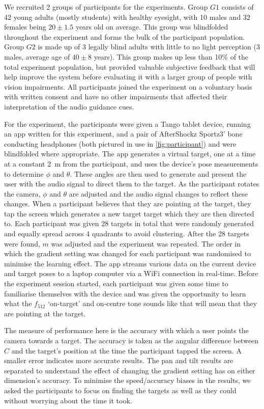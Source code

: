 \documentclass{llncs}
\begin{document}
We recruited 2 groups of participants for the experiments.
Group $G1$ consists of 42 young adults (mostly students) with healthy eyesight, with 10 males and 32 females being $20\pm1.5$ years old on average.
This group was blindfolded throughout the experiment and forms the bulk of the participant population.
Group $G2$ is made up of 3 legally blind adults with little to no light perception (3 males, average age of $40\pm8$ years). 
This group makes up less than 10\% of the total experiment population, but provided valuable subjective feedback that will help improve the system before evaluating it with a larger group of people with vision impairments. 
All participants joined the experiment on a voluntary basis with written consent and have no other impairments that affected their interpretation of the audio guidance cues.

For the experiment, the participants were given a Tango tablet device, running an app written for this experiment, and a pair of AfterShockz Sportz3' bone conducting headphones (both pictured in use in \cref{fig:participant}) and were blindfolded where appropriate.
The app generates a virtual target, one at a time at a constant \SI{2}{\metre} from the participant, and uses the device's pose measurements to determine $\phi$ and $\theta$.
These angles are then used to generate and present the user with the audio signal to direct them to the target. 
As the participant rotates the camera, $\phi$ and $\theta$ are adjusted and the audio signal changes to reflect these changes.
When a participant believes that they are pointing at the target, they tap the screen which generates a new target target which they are then directed to. 
Each participant was given 28 targets in total that were randomly generated and equally spread across 4 quadrants to avoid clustering. 
After the 28 targets were found, $m$ was adjusted and the experiment was repeated. 
The order in which the gradient setting was changed for each participant was randomised to minimise the learning effect.
The app streams various data on the current device and target poses to a laptop computer via a WiFi connection in real-time. 
Before the experiment session started, each participant was given some time to familiarise themselves with the device and was given the opportunity to learn what the $f_{512}$ `on-target' and on-centre tone sounds like that will mean that they are pointing at the target.

The measure of performance here is the accuracy with which a user points the camera towards a target.
The accuracy is taken as the angular difference between $C$ and the target's position at the time the participant tapped the screen.
A smaller error indicates more accurate results.
The pan and tilt results are separated to understand the effect of changing the gradient setting has on either dimension's accuracy.
To minimise the speed/accuracy biases in the results, we asked the participants to focus on finding the targets as well as they could without worrying about the time it took.  
\end{document}
